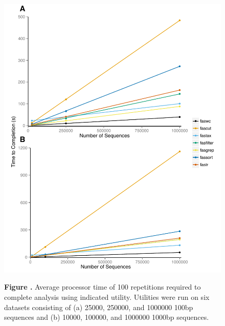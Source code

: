 \documentclass{frontiersSCNS} %
\begin{document}
\begin{figure}
\begin{center}
\includegraphics{Figure2}
\end{center}
\textbf{\label{fig:02} Figure
  .}{ Average processor time of 100 repetitions
  required to complete analysis using indicated utility. Utilities
  were run on six datasets consisting of (a) 25000, 250000, and
  1000000 100bp sequences and (b) 10000, 100000, and 1000000 1000bp
  sequences. }
\end{figure}
\end{document}
